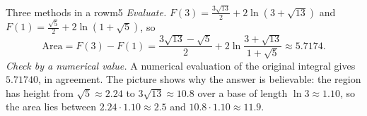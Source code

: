\documentclass[11pt]{article}
\begin{document}
\begin{exmp}{Three methods in a row}{m5}
\emph{Evaluate.} $F(3)=\frac{3\sqrt{13}}2+2\ln\left(3+\sqrt{13}\right)$ and $F(1)=\frac{\sqrt5}2+2\ln\left(1+\sqrt5\right)$, so
\[\text{Area}=F(3)-F(1)=\frac{3\sqrt{13}-\sqrt5}2+2\ln\frac{3+\sqrt{13}}{1+\sqrt5}\approx5.7174 .\]
\emph{Check by a numerical value.} A numerical evaluation of the original integral gives $5.71740$, in agreement. The picture shows why the answer is believable: the region has height from $\sqrt5\approx2.24$ to $3\sqrt{13}\approx10.8$ over a base of length $\ln3\approx1.10$, so the area lies between $2.24\cdot1.10\approx2.5$ and $10.8\cdot1.10\approx11.9$.


\end{exmp}
\end{document}
